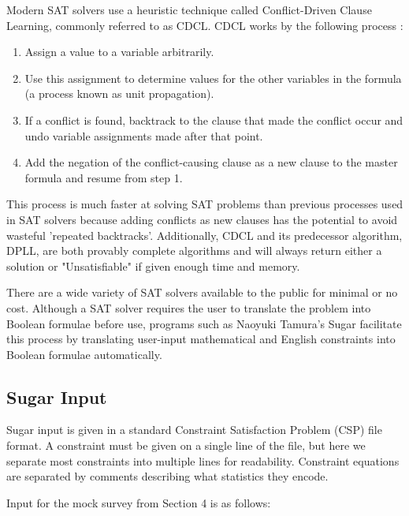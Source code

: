 \documentclass[runningheads]{llncs}
\begin{document}
Modern SAT solvers use a heuristic technique called Conflict-Driven Clause Learning, commonly referred to as CDCL. CDCL works by the following process \cite{cdcl}:

\begin{enumerate}

\item Assign a value to a variable arbitrarily.
\item Use this assignment to determine values for the other variables in the formula (a process known as unit propagation).
\item If a conflict is found, backtrack to the clause that made the conflict occur and undo variable assignments made after that point.
\item Add the negation of the conflict-causing clause as a new clause to the master formula and resume from step 1.

\end{enumerate}

This process is much faster at solving SAT problems than previous processes used in SAT solvers because adding conflicts as new clauses has the potential to avoid wasteful 'repeated backtracks'. Additionally, CDCL and its predecessor algorithm, DPLL, are both provably complete algorithms and will always return either a solution or "Unsatisfiable" if given enough time and memory.

There are a wide variety of SAT solvers available to the public for minimal or no cost. Although a SAT solver requires the user to translate the problem into Boolean formulae before use,  programs such as Naoyuki Tamura's Sugar facilitate this process by translating user-input mathematical and English constraints into Boolean formulae automatically.



\subsection{Sugar Input}

Sugar input is given in a standard Constraint Satisfaction Problem (CSP) file format. A constraint must be given on a single line of the file, but here we separate most constraints into multiple lines for readability. Constraint equations are separated by comments describing what statistics they encode.

Input for the mock survey from Section 4 is as follows:
\end{document}
